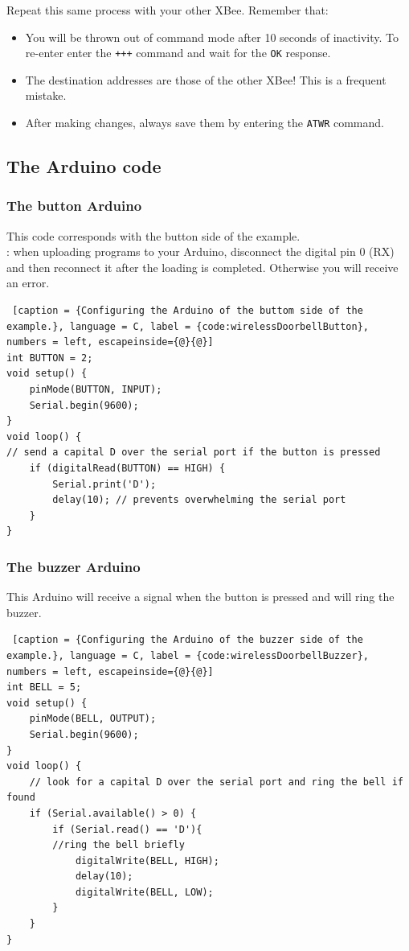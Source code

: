 Repeat this same process with your other XBee. Remember that:

\begin{itemize}
  \item You will be thrown out of command mode after 10 seconds of inactivity. To re-enter enter the \texttt{+++} command and wait for the \texttt{OK} response.
  \item The destination addresses are those of the other XBee! This is a frequent mistake.
  \item After making changes, always save them by entering the \texttt{ATWR} command.
\end{itemize}

\subsection{The Arduino code}
\subsubsection{The button Arduino}
This code corresponds with the button side of the example.
\\
{\color{red}{There's a trap!}}: when uploading programs to your Arduino, disconnect the digital pin 0 (RX) and then reconnect it after the loading is completed. Otherwise you will receive an error.

\begin{lstlisting} [caption = {Configuring the Arduino of the buttom side of the example.}, language = C, label = {code:wirelessDoorbellButton}, numbers = left, escapeinside={@}{@}] 
int BUTTON = 2;
void setup() { 
	pinMode(BUTTON, INPUT); 
	Serial.begin(9600);
}
void loop() {
// send a capital D over the serial port if the button is pressed
	if (digitalRead(BUTTON) == HIGH) { 
		Serial.print('D');
		delay(10); // prevents overwhelming the serial port 
	}
}
\end{lstlisting}

\subsubsection{The buzzer Arduino}
This Arduino will receive a signal when the button is pressed and will ring the buzzer.

\begin{lstlisting} [caption = {Configuring the Arduino of the buzzer side of the example.}, language = C, label = {code:wirelessDoorbellBuzzer}, numbers = left, escapeinside={@}{@}]
int BELL = 5;
void setup() { 
	pinMode(BELL, OUTPUT); 
	Serial.begin(9600);
}
void loop() {
	// look for a capital D over the serial port and ring the bell if found 
	if (Serial.available() > 0) {
		if (Serial.read() == 'D'){ 
		//ring the bell briefly 
			digitalWrite(BELL, HIGH); 
			delay(10); 
			digitalWrite(BELL, LOW);
		}		 
	}
}
\end{lstlisting}

